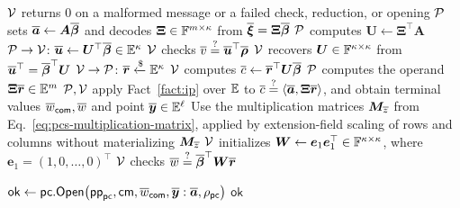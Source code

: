 \begin{algorithm}[!t]
\caption{Packed opening protocol}
\label{alg:packed-pcs}

\(\mathcal{V}\) returns \(0\) on a malformed message or a failed
check, reduction, or opening\;
\(\mathcal{P}\) sets
\(\overline{\bm a}\leftarrow\bm A\overline{\bm\beta}\) and decodes
\(\bm\Xi\in{\mathbb{F}}^{m\times\kappa}\) from
\(\overline{\bm\xi}=\bm\Xi\overline{\bm\beta}\)\;
\(\mathcal{P}\) computes \(\bm U\leftarrow\bm\Xi^\top\bm A\)\;
\({\mathcal{P} \rightarrow \mathcal{V}}\): \(\overline{\bm u}\leftarrow\bm U^\top\overline{\bm\beta}
\in\mathbb{E}^\kappa\)\;
\(\mathcal{V}\) checks
\(\overline{v}\mathrel{\overset{\mathrm{?}}{=}}\overline{\bm u}^{\top}\overline{\bm\rho}\)\;
\(\mathcal{V}\) recovers \(\bm U\in{\mathbb{F}}^{\kappa\times\kappa}\)
from \(\overline{\bm u}^{\top}=\overline{\bm\beta}^{\top}\bm U\)\;
\({\mathcal{V} \rightarrow \mathcal{P}}\): \(\overline{\bm r}\mathrel{\xleftarrow{\$}}\mathbb{E}^\kappa\)\;
\(\mathcal{V}\) computes
\(\overline{c}\leftarrow\overline{\bm r}^{\top}\bm U\overline{\bm\beta}\)\;
\(\mathcal{P}\) computes the operand
\(\bm\Xi\overline{\bm r}\in\mathbb{E}^m\)\;
\(\mathcal{P},\mathcal{V}\) apply Fact~\ref{fact:ip} over
\(\mathbb{E}\) to
\(\overline{c}\mathrel{\overset{\mathrm{?}}{=}}\langle\overline{\bm a},\bm\Xi\overline{\bm r}\rangle\),
and obtain terminal values \(\overline{w}_{\mathsf{com}},\overline{w}\)
and point \(\overline{\bm y}\in\mathbb{E}^\ell\)\;
Use the multiplication matrices \(\bm M_{\overline{z}}\) from
Eq.~\eqref{eq:pcs-multiplication-matrix}, applied by extension-field
scaling of rows and columns without materializing \(\bm M_{\overline{z}}\)\;
\(\mathcal{V}\) initializes
\(\bm W\leftarrow\bm e_1\bm e_1^\top\in{\mathbb{F}}^{\kappa\times\kappa}\),
where \(\bm e_1=(1,0,\ldots,0)^\top\)\;
\(\mathcal{V}\) checks
\(\overline{w}\mathrel{\overset{\mathrm{?}}{=}}\overline{\bm\beta}^{\top}\bm W\overline{\bm r}\)\;

\(\mathsf{ok}\leftarrow
{\sf pc}.{\sf Open}\!\left(
    \mathsf{pp}_{{\sf pc}},\mathsf{cm},\overline{w}_{\mathsf{com}},
    \overline{\bm y}:\overline{\bm a},\rho_{{\sf pc}}
\right)\)\;
\Return \(\mathsf{ok}\)\;
\end{algorithm}
